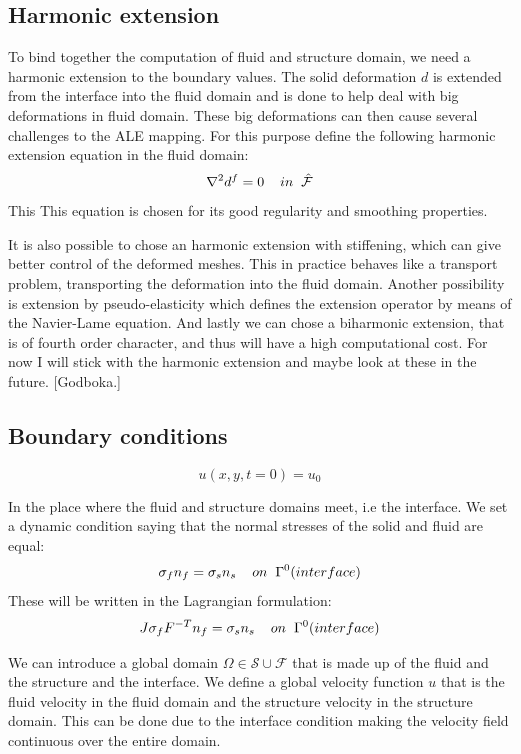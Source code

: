 \subsection*{Harmonic extension}
To bind together the computation of fluid and structure domain, we need a harmonic extension to the boundary values. The solid deformation $d$ is extended from the interface into the fluid domain and is done to help deal with big deformations in fluid domain. These big deformations can then cause several challenges to the ALE mapping. 
For this purpose define the following harmonic extension equation in the fluid domain:
$$ \nabla^2 d^f = 0\hspace{4mm}in \hspace{2mm} \mathcal{\hat{F}}$$
This 
This equation is chosen for its good regularity and smoothing properties.

It is also possible to chose an harmonic extension with stiffening, which can give better control of the deformed meshes. This in practice behaves like a transport problem, transporting the deformation into the fluid domain. Another possibility is extension by pseudo-elasticity which defines the extension operator by means of the Navier-Lame equation. And lastly we can chose a biharmonic extension, that is of fourth order character, and thus will have a high computational cost. For now I will stick with the harmonic extension and maybe look at these in the future. [Godboka.]

\subsection*{Boundary conditions}
$$  u(x,y,t=0) = u_0   $$

In the place where the fluid and structure domains meet, i.e the interface. We set a dynamic condition saying that the normal stresses of the solid and fluid are equal:
$$  \sigma_f n_f = \sigma_s n_s \hspace{4mm} on  \hspace{2mm}\Gamma^0 (interface)   $$
These will be written in the Lagrangian formulation:
$$  J\sigma_f F^{-T} n_f = \sigma_s  n_s \hspace{4mm} on  \hspace{2mm}\Gamma^0 (interface)   $$

We can introduce a global domain $\Omega \in \mathcal{S} \cup \mathcal{F} $ that is made up of the fluid and the structure and the interface. We define a global velocity function $u$ that is the fluid velocity in the fluid domain and the structure velocity in the structure domain. This can be done due to the interface condition making the velocity field continuous over the entire domain.  


